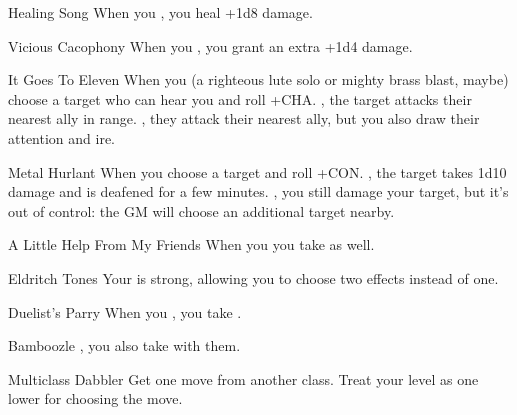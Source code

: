 \documentclass[8pt]{extarticle}
\begin{document}

\begin{multicols}{2}
\firstAdvances

\begin{amove}{Healing Song}
  When you , you heal +1d8
  damage.
\end{amove}

\begin{amove}{Vicious Cacophony}
  When you , you
  grant an extra +1d4 damage.
\end{amove}

\begin{amove}{It Goes To Eleven}
  When you  (a righteous lute
  solo or mighty brass blast, maybe) choose a target who can hear you
  and roll +CHA. \onSuccess, the target attacks their nearest ally in
  range. \onPartial, they attack their nearest ally, but you also draw
  their attention and ire.
\end{amove}


\begin{amove}{Metal Hurlant}
  When you  choose a target and roll +CON. \onSuccess, the target takes
  1d10 damage and is deafened for a few minutes. \onPartial, you still
  damage your target, but it’s out of control: the GM will choose an
  additional target nearby.
\end{amove}


\begin{amove}{A Little Help From My Friends}
  When you  you take  as
  well.
\end{amove}


\begin{amove}{Eldritch Tones}
  Your  is strong, allowing you to choose two effects
  instead of one.
\end{amove}


\begin{amove}{Duelist’s Parry}
  When you , you take .
\end{amove}

\begin{amove}{Bamboozle}
  , you also take  with them.
\end{amove}


\begin{amove}{Multiclass Dabbler}
  Get one move from another class. Treat your level as one lower for
  choosing the move.
\end{amove}



\end{multicols}
\end{document}
